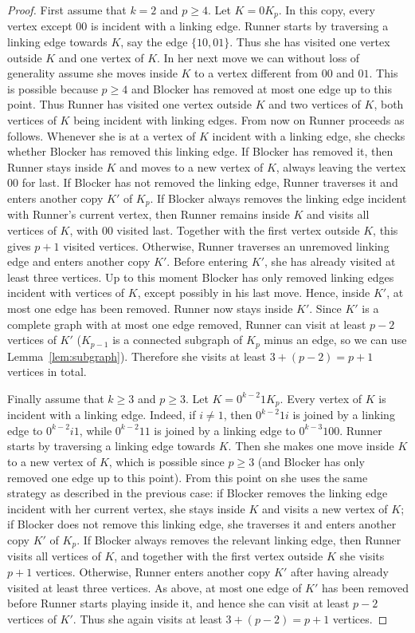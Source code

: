 \documentclass[10pt,a4paper]{amsart}
\begin{document}
\begin{proof}
First assume that $k=2$ and $p\ge 4$. Let $K=0K_p$. In this copy, every vertex except $00$ is incident with a linking edge. Runner starts by traversing a linking edge towards $K$, say the edge $\{10,01\}$. Thus she has visited one vertex outside $K$ and one vertex of $K$. In her next move we can without loss of generality assume she moves inside $K$ to a vertex different from $00$ and $01$. This is possible because $p\ge 4$ and Blocker has removed at most one edge up to this point. Thus Runner has visited one vertex outside $K$ and two vertices of $K$, both vertices of $K$ being incident with linking edges. From now on Runner proceeds as follows. Whenever she is at a vertex of $K$ incident with a linking edge, she checks whether Blocker has removed this linking edge. If Blocker has removed it, then Runner stays inside $K$ and moves to a new vertex of $K$, always leaving the vertex $00$ for last. If Blocker has not removed the linking edge, Runner traverses it and enters another copy $K'$ of $K_p$. If Blocker always removes the linking edge incident with Runner's current vertex, then Runner remains inside $K$ and visits all vertices of $K$, with $00$ visited last. Together with the first vertex outside $K$, this gives $p+1$ visited vertices. Otherwise, Runner traverses an unremoved linking edge and enters another copy $K'$. Before entering $K'$, she has already visited at least three vertices. Up to this moment Blocker has only removed linking edges incident with vertices of $K$, except possibly in his last move. Hence, inside $K'$, at most one edge has been removed. Runner now stays inside $K'$. Since $K'$ is a complete graph with at most one edge removed, Runner can visit at least $p-2$ vertices of $K'$ ($K_{p-1}$ is a connected subgraph of $K_p$ minus an edge, so we can use Lemma~\ref{lem:subgraph}). Therefore she visits at least
$3+(p-2)=p+1$ vertices in total.

Finally assume that $k\ge 3$ and $p\ge 3$. Let $K=0^{k-2}1K_p$. Every vertex of $K$ is incident with a linking edge. Indeed, if $i\ne 1$, then $0^{k-2}1i$ is joined by a linking edge to $0^{k-2}i1$, while $0^{k-2}11$ is
joined by a linking edge to $0^{k-3}100$. Runner starts by traversing a linking edge towards $K$. Then she makes one move inside $K$ to a new vertex of $K$, which is possible since $p\ge 3$ (and Blocker has only removed one edge up to this point). From this point on she uses the same strategy as described in the previous case: if Blocker removes the linking edge incident with her current vertex, she stays inside $K$ and visits a new vertex of $K$; if Blocker does not remove this linking edge, she traverses it and enters another copy $K'$ of $K_p$. If Blocker always removes the relevant linking edge, then Runner visits all vertices of $K$, and together with the first vertex outside $K$ she visits $p+1$ vertices. Otherwise, Runner enters another copy $K'$ after having already visited at least three vertices. As above, at most one edge of $K'$ has been removed before Runner starts playing inside it, and hence she can visit at least $p-2$ vertices of $K'$. Thus she again visits at least $3+(p-2)=p+1$ vertices.


\end{proof}
\end{document}
